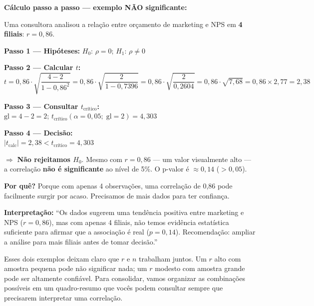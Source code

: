 \begin{SolvedBox}
\textbf{Cálculo passo a passo — exemplo NÃO significante:}

Uma consultora analisou a relação entre orçamento de marketing e NPS
em \textbf{4 filiais}: $r = 0{,}86$.

\textbf{Passo 1 — Hipóteses:} $H_0$: $\rho = 0$; $H_1$: $\rho \neq 0$

\textbf{Passo 2 — Calcular $t$:}
\[
t = 0{,}86 \cdot \sqrt{\frac{4 - 2}{1 - 0{,}86^2}}
  = 0{,}86 \cdot \sqrt{\frac{2}{1 - 0{,}7396}}
  = 0{,}86 \cdot \sqrt{\frac{2}{0{,}2604}}
  = 0{,}86 \cdot \sqrt{7{,}68}
  = 0{,}86 \times 2{,}77
  = 2{,}38
\]

\textbf{Passo 3 — Consultar $t_{\text{crítico}}$:}\\
$\text{gl} = 4 - 2 = 2$;
$t_{\text{crítico}}(\alpha = 0{,}05;\; \text{gl} = 2) = 4{,}303$

\textbf{Passo 4 — Decisão:}\\
$|t_{\text{calc}}| = 2{,}38 < t_{\text{crítico}} = 4{,}303$

$\Rightarrow$ \textbf{Não rejeitamos $H_0$}.
Mesmo com $r = 0{,}86$ — um valor visualmente alto — a correlação
\textbf{não é significante} ao nível de 5\%. O p-valor é $\approx 0{,}14$
($> 0{,}05$).

\textbf{Por quê?} Porque com apenas 4 observações, uma correlação de 0,86
pode facilmente surgir por acaso. Precisamos de mais dados para ter
confiança.

\textbf{Interpretação:}
``Os dados sugerem uma tendência positiva entre marketing e NPS
($r = 0{,}86$), mas com apenas 4 filiais, não temos evidência estatística
suficiente para afirmar que a associação é real ($p = 0{,}14$).
Recomendação: ampliar a análise para mais filiais antes de tomar decisão.''
\end{SolvedBox}

Esses dois exemplos deixam claro que $r$ e $n$ trabalham juntos.
Um $r$ alto com amostra pequena pode não significar nada;
um $r$ modesto com amostra grande pode ser altamente confiável.
Para consolidar, vamos organizar as combinações possíveis em um
quadro-resumo que vocês podem consultar sempre que precisarem
interpretar uma correlação.

